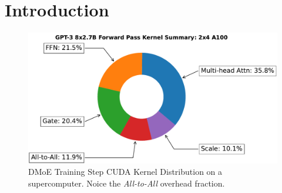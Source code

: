 
\section{Introduction}\label{sec:introduction}
\begin{figure}[!h]
    \centering
    \includegraphics[width=0.8\linewidth, keepaspectratio]{images/multi_sum_2x4_2.7B_donut}
    \caption{\footnotesize DMoE Training Step CUDA Kernel Distribution on a supercomputer.
    Noice the \emph{All-to-All} overhead fraction.}
    \label{fig:donut}
\end{figure}

